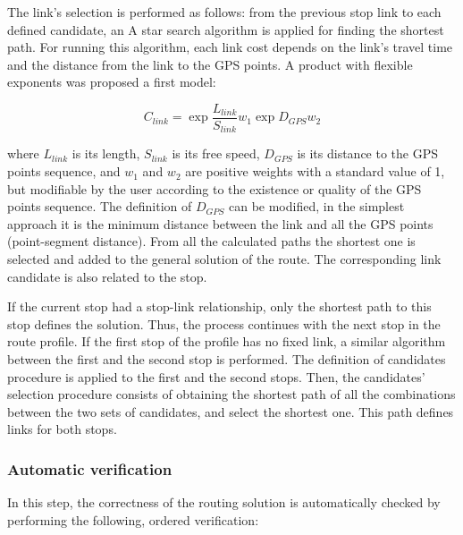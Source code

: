 The link's selection is performed as follows: from the previous stop link to each defined candidate, an A star search algorithm is applied for finding the shortest path. For running this algorithm, each link cost depends on the link's travel time and the distance from the link to the GPS points. A product with flexible exponents was proposed a first model:

\begin{equation}\label{eq:LinkCost}
	C_{link} = \exp{\frac{L_{link}}{S_{link}}}{w_{1}}\exp{D_{GPS}}{w_{2}}
\end{equation}

where $L_{link}$ is its length, $S_{link}$ is its free speed, $D_{GPS}$ is its distance to the GPS points sequence, and $w_{1}$ and $w_{2}$ are positive weights with a standard value of 1, but modifiable by the user according to the existence or quality of the GPS points sequence. The definition of $D_{GPS}$ can be modified, in the simplest approach it is the minimum distance between the link and all the GPS points (point-segment distance). From all the calculated paths the shortest one is selected and added to the general solution of the route. The corresponding link candidate is also related to the stop. 

If the current stop had a stop-link relationship, only the shortest path to this stop defines the solution. Thus, the process continues with the next stop in the route profile. If the first stop of the profile has no fixed link, a similar algorithm between the first and the second stop is performed. The definition of candidates procedure is applied to the first and the second stops. Then, the candidates' selection procedure consists of obtaining the shortest path of all the combinations between the two sets of candidates, and select the shortest one. This path defines links for both stops.

\subsubsection{Automatic verification}

In this step, the correctness of the routing solution is automatically checked by performing the following, ordered verification:

